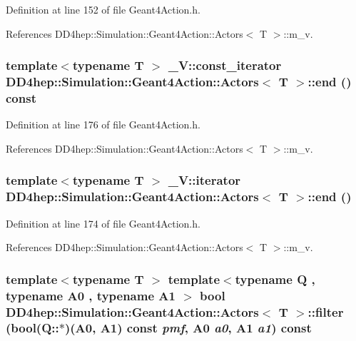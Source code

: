 Definition at line 152 of file Geant4Action.h.

References DD4hep::Simulation::Geant4Action::Actors$<$ T $>$::m\_\-v.\hypertarget{class_d_d4hep_1_1_simulation_1_1_geant4_action_1_1_actors_ad612f86da710cf1ab66e2d381a4ec75f}{
\subsubsection[{end}]{\setlength{\rightskip}{0pt plus 5cm}template$<$typename T $>$ \_\-V::const\_\-iterator {\bf DD4hep::Simulation::Geant4Action::Actors}$<$ {\bf T} $>$::end () const}}
\label{class_d_d4hep_1_1_simulation_1_1_geant4_action_1_1_actors_ad612f86da710cf1ab66e2d381a4ec75f}


Definition at line 176 of file Geant4Action.h.

References DD4hep::Simulation::Geant4Action::Actors$<$ T $>$::m\_\-v.\hypertarget{class_d_d4hep_1_1_simulation_1_1_geant4_action_1_1_actors_aa1b133c19db8c70d6a46a19fefa430a2}{
\subsubsection[{end}]{\setlength{\rightskip}{0pt plus 5cm}template$<$typename T $>$ \_\-V::iterator {\bf DD4hep::Simulation::Geant4Action::Actors}$<$ {\bf T} $>$::end ()}}
\label{class_d_d4hep_1_1_simulation_1_1_geant4_action_1_1_actors_aa1b133c19db8c70d6a46a19fefa430a2}


Definition at line 174 of file Geant4Action.h.

References DD4hep::Simulation::Geant4Action::Actors$<$ T $>$::m\_\-v.\hypertarget{class_d_d4hep_1_1_simulation_1_1_geant4_action_1_1_actors_adcb471bd813492a95319bb67cc981d32}{
\subsubsection[{filter}]{\setlength{\rightskip}{0pt plus 5cm}template$<$typename T $>$ template$<$typename Q , typename A0 , typename A1 $>$ bool {\bf DD4hep::Simulation::Geant4Action::Actors}$<$ {\bf T} $>$::filter (bool(Q::$\ast$)(A0, A1) const  {\em pmf}, \/  A0 {\em a0}, \/  A1 {\em a1}) const}}
\label{class_d_d4hep_1_1_simulation_1_1_geant4_action_1_1_actors_adcb471bd813492a95319bb67cc981d32}


